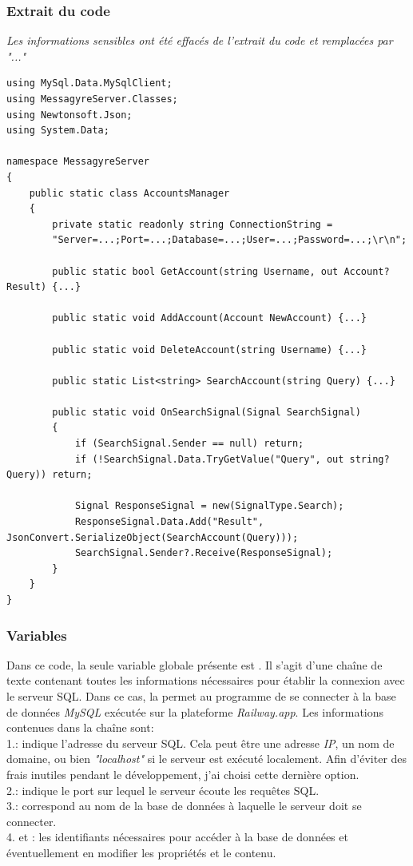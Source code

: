 \documentclass[12pt]{report}
\begin{document}
	\subsubsection{Extrait du code}
	\textit{Les informations sensibles ont été effacés de l'extrait du code et remplacées par "..."}
	\begin{verbatim}
using MySql.Data.MySqlClient;
using MessagyreServer.Classes;
using Newtonsoft.Json;
using System.Data;

namespace MessagyreServer
{
	public static class AccountsManager
	{
		private static readonly string ConnectionString =
		"Server=...;Port=...;Database=...;User=...;Password=...;\r\n";
		
		public static bool GetAccount(string Username, out Account? Result) {...}
		
		public static void AddAccount(Account NewAccount) {...}
		
		public static void DeleteAccount(string Username) {...}
		
		public static List<string> SearchAccount(string Query) {...}
		
		public static void OnSearchSignal(Signal SearchSignal)
		{
			if (SearchSignal.Sender == null) return;
			if (!SearchSignal.Data.TryGetValue("Query", out string? Query)) return;
			
			Signal ResponseSignal = new(SignalType.Search);
			ResponseSignal.Data.Add("Result", JsonConvert.SerializeObject(SearchAccount(Query)));
			SearchSignal.Sender?.Receive(ResponseSignal);
		}
	}
}
	\end{verbatim}
\subsubsection{Variables}
Dans ce code, la seule variable globale présente est . Il s’agit d’une chaîne de texte contenant toutes les informations nécessaires pour établir la connexion avec le serveur SQL. Dans ce cas, la  permet au programme de se connecter à la base de données \textit{MySQL} exécutée sur la plateforme \textit{Railway.app}. Les informations contenues dans la chaîne sont: \\
1.: indique l’adresse du serveur SQL. Cela peut être une adresse \textit{IP}, un nom de domaine, ou bien \textit{"localhost"} si le serveur est exécuté localement. Afin d’éviter des frais inutiles pendant le développement, j’ai choisi cette dernière option.\\
2.: indique le port sur lequel le serveur écoute les requêtes SQL.\\
3.: correspond au nom de la base de données à laquelle le serveur doit se connecter.\\
4. et : les identifiants nécessaires pour accéder à la base de données et éventuellement en modifier les propriétés et le contenu.
\end{document}

